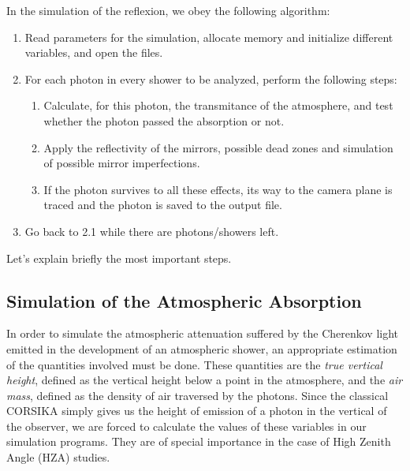 \simprocessfig
%
In the simulation of the reflexion, we obey the following algorithm:
%
\begin{enumerate}[1.]
\item Read parameters for the simulation, allocate memory and
  initialize different variables, and open the files.

\item For each \Cherenkov photon in every shower to be analyzed,
  perform the following steps:
  
  \begin{enumerate}[\theenumi.1.]
  \item Calculate, for this photon, the transmitance of the
    atmosphere, and test whether the photon passed the absorption or
    not.
    
  \item Apply the reflectivity of the mirrors, possible dead zones and
    simulation of possible mirror imperfections.

  \item If the photon survives to all these effects, its way to the
    camera plane is traced and the photon is saved to the output file.
  \end{enumerate}

\item Go back to 2.1 while there are photons/showers left.
\end{enumerate}

Let's explain briefly the most important steps.

\subsection{Simulation of the Atmospheric Absorption}

In order to simulate the atmospheric attenuation suffered by the
Cherenkov light emitted in the development of an atmospheric shower,
an appropriate estimation of the quantities involved must be done.
These quantities are the \emph{true vertical height}, defined as the
vertical height below a point in the atmosphere, and the \emph{air
  mass}, defined as the density of air traversed by the photons. Since
the classical CORSIKA simply gives us the height of emission of a
photon in the vertical of the observer, we are forced to calculate the
values of these variables in our simulation programs. They are of
special importance in the case of High Zenith Angle (HZA) studies.

